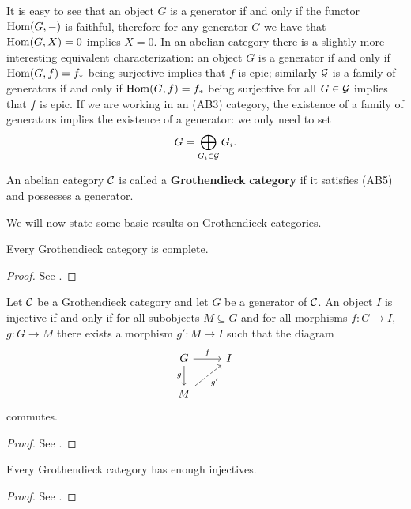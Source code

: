 \begin{remark}
	It is easy to see that an object $G$ is a generator if and only if the functor $\mathrm{Hom}(G, {-})$ is faithful, therefore for any generator $G$ we have that $\mathrm{Hom}(G, X) = 0$ implies $X=0$. In an abelian category there is a slightly more interesting equivalent characterization: an object $G$ is a generator if and only if $\mathrm{Hom}(G, f) = f_*$ being surjective implies that $f$ is epic; similarly $\mathcal{G}$ is a family of generators if and only if $\mathrm{Hom}(G, f) = f_*$ being surjective for all $G \in \mathcal{G}$ implies that $f$ is epic. If we are working in an (AB3) category, the existence of a family of generators implies the existence of a generator: we only need to set
	\[G = \bigoplus_{G_i \in \mathcal{G}} G_i.\]
\end{remark}


\begin{definition}
	An abelian category $\mathcal{C}$ is called a \textbf{Grothendieck} \textbf{category} if it satisfies (AB5) and possesses a generator.
\end{definition}

We will now state some basic results on Grothendieck categories.

\begin{theorem}
	Every Grothendieck category is complete.
\end{theorem}
\begin{proof}
	See \cite{Borceux_1994}.
\end{proof}

\begin{proposition}
    Let $\mathcal{C}$ be a Grothendieck category and let $G$ be a generator of $\mathcal{C}$. An object $I$ is injective if and only if for all subobjects $M \subseteq G$ and for all morphisms $f\colon G \longrightarrow I$, $g\colon G \longrightarrow M$ there exists a morphism $g' \colon M \longrightarrow I$ such that the diagram
	\[\begin{tikzcd}
		G & I \\
		M
		\arrow["f", from=1-1, to=1-2]
		\arrow["g"', from=1-1, to=2-1]
		\arrow["{g'}"', dashed, from=2-1, to=1-2]
	\end{tikzcd}\]
	commutes.
\end{proposition}

\begin{proof}
    See  \cite[\href{https://stacks.math.columbia.edu/tag/05AB}{Section 05AB}]{stacks-project}.
\end{proof}



\begin{theorem}
	Every Grothendieck category has enough injectives.
\end{theorem}
\begin{proof}
	See \cite{Tohoku}.
\end{proof}
